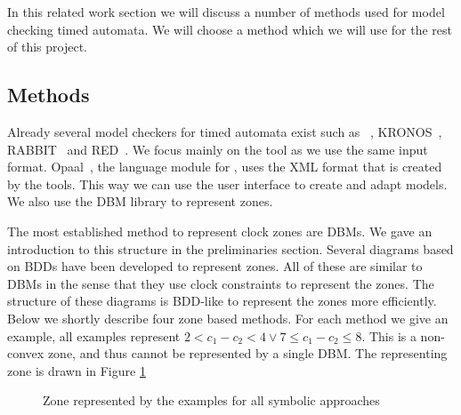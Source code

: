 In this related work section we will discuss a number of methods used for model checking timed automata. We will choose a method which we will use for the rest of this project.

\subsection{Methods}
Already several model checkers for timed automata exist such as \uppaal{}~\cite{UPPAAL}, KRONOS~\cite{kronos}, RABBIT~\cite{CAV03} and RED~\cite{crds}. We focus mainly on the \uppaal{} tool as we use the same input format. Opaal~\cite{opaal}, the language module for \ltsmin{}, uses the XML format that is created by the \uppaal{} tools. This way we can use the \uppaal{} user interface to create and adapt models. We also use the \uppaal{} DBM library to represent zones.

The most established method to represent clock zones are DBMs. We gave an introduction to this structure in the preliminaries section. Several diagrams based on BDDs have been developed to represent zones. All of these are similar to DBMs in the sense that they use clock constraints to represent the zones. The structure of these diagrams is BDD-like to represent the zones more efficiently. Below we shortly describe four zone based methods. For each method we give an example, all examples represent $2 < c_1 - c_2 < 4 \vee 7 \leq c_1 - c_2 \leq 8$. This is a non-convex zone, and thus cannot be represented by a single DBM. The representing zone is drawn in Figure \ref{fig:symbolic-example}

\begin{figure}[h]
\centering
{}
\caption{Zone represented by the examples for all symbolic approaches}
\label{fig:symbolic-example}
\end{figure}


